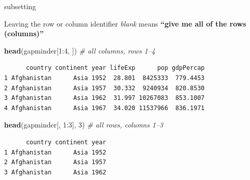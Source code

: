 \documentclass[10pt,ignorenonframetext,compress, aspectratio=169]{beamer}
\newenvironment{Shaded}{\begin{snugshade}}{\end{snugshade}}
\newcommand{\KeywordTok}[1]{\textcolor[rgb]{0.13,0.29,0.53}{\textbf{{#1}}}}
\newcommand{\DecValTok}[1]{\textcolor[rgb]{0.00,0.00,0.81}{{#1}}}
\newcommand{\CommentTok}[1]{\textcolor[rgb]{0.56,0.35,0.01}{\textit{{#1}}}}
\newcommand{\NormalTok}[1]{{#1}}
\begin{document}
\begin{frame}[fragile]{subsetting}

Leaving the row or column identifier \emph{blank} means \textbf{``give
me all of the rows (columns)''}

\scriptsize

\begin{Shaded}
\begin{Highlighting}[]
\KeywordTok{head}\NormalTok{(gapminder[}\DecValTok{1}\NormalTok{:}\DecValTok{4}\NormalTok{, ])                  }\CommentTok{# all columns, rows 1--4}
\end{Highlighting}
\end{Shaded}

\begin{verbatim}
      country continent year lifeExp      pop gdpPercap
1 Afghanistan      Asia 1952  28.801  8425333  779.4453
2 Afghanistan      Asia 1957  30.332  9240934  820.8530
3 Afghanistan      Asia 1962  31.997 10267083  853.1007
4 Afghanistan      Asia 1967  34.020 11537966  836.1971
\end{verbatim}

\normalsize

\scriptsize

\begin{Shaded}
\begin{Highlighting}[]
\KeywordTok{head}\NormalTok{(gapminder[, }\DecValTok{1}\NormalTok{:}\DecValTok{3}\NormalTok{], }\DecValTok{3}\NormalTok{)               }\CommentTok{# all rows, columns 1--3}
\end{Highlighting}
\end{Shaded}

\begin{verbatim}
      country continent year
1 Afghanistan      Asia 1952
2 Afghanistan      Asia 1957
3 Afghanistan      Asia 1962
\end{verbatim}

\normalsize

\end{frame}
\end{document}
